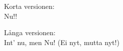\vspace{10pt}
Korta versionen:\\
Nu!!\par
\vspace{10pt}
Långa versionen:\\
Int' nu, men Nu! (Ei nyt, mutta nyt!)
